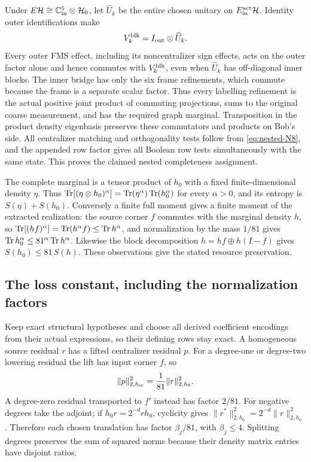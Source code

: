 Under $E\mathcal H\cong\mathbb C^5_{\rm in}\otimes\mathcal H_0$, let
$\widehat U_k$ be the entire chosen unitary on ${E^{\rm act}_{\rm in}}\mathcal H$.
Identity outer identifications make
\[
                    {V^{\rm blk}_k}=I_{\rm out}\otimes\widehat U_k.
\]
Every outer FMS effect, including its noncentralizer sign effects,
acts on the outer factor alone and hence commutes with ${V^{\rm blk}_k}$,
even when $\widehat U_k$ has off-diagonal inner blocks. The inner
bridge has only the six frame refinements, which commute because
the frame is a separate scalar factor. Thus every labelling
refinement is the actual positive joint product of commuting
projections, sums to the original coarse measurement, and has the
required graph marginal. Transposition in the product density eigenbasis preserves
these commutators and products on Bob's side. All centralizer
matching and orthogonality tests follow from \eqref{eq:nested-N8}, and the appended
row factor gives all Boolean row tests simultaneously with the same
state. This proves the claimed nested completeness assignment.

The complete marginal is a tensor product of $h_0$ with a fixed
finite-dimensional density $\eta$. Thus
$\operatorname{Tr}[(\eta\otimes h_0)^\alpha]=\operatorname{Tr}(\eta^\alpha)\operatorname{Tr}(h_0^\alpha)$
for every $\alpha>0$, and its entropy is $S(\eta)+S(h_0)$.
Conversely a finite full moment gives a finite moment of the extracted
realization: the source corner $f$ commutes with the marginal density $h$, so
$\operatorname{Tr}[(hf)^\alpha]=\operatorname{Tr}(h^\alpha f)\le\operatorname{Tr} h^\alpha$, and normalization by the
mass $1/81$ gives $\operatorname{Tr} h_0^\alpha\le81^\alpha\operatorname{Tr} h^\alpha$. Likewise the block
decomposition $h=hf\oplus h(I-f)$ gives $S(h_0)\le81\,S(h)$.
These observations give the stated resource preservation.

\subsection{The loss constant, including the normalization factors}
Keep exact structural hypotheses and choose all derived coefficient
encodings from their actual expressions, so their defining rows stay
exact. A homogeneous source residual $r$ has a lifted centralizer
residual $p$. For a degree-one or degree-two lowering residual the
lift has input corner $f$, so
\[
 \|p\|_{2,h_{\rm sc}}^2=\frac1{81}\|r\|_{2,h_0}^2.
\]
A degree-zero residual transported to $f'$ instead has factor $2/81$.
For negative degrees take the adjoint; if $h_0r=2^{-d}rh_0$,
cyclicity gives $\|r^*\|_{2,h_0}^2=2^{-d}\|r\|_{2,h_0}^2$.
Therefore each chosen translation has factor $\beta_j/81$, with
$\beta_j\le4$. Splitting degrees preserves the sum of squared norms
because their density matrix entries have disjoint ratios.

